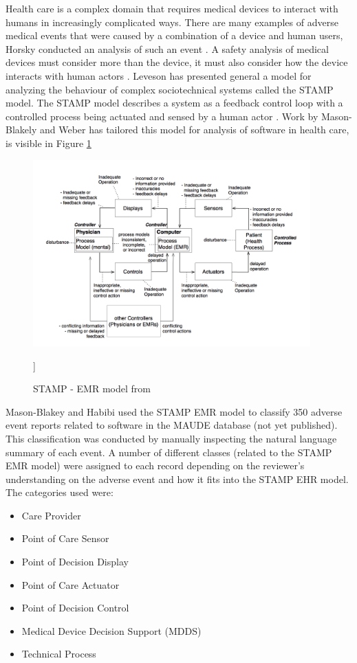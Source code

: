 \documentclass[11pt, notitlepage,abstracton,oneside]{article}   	%
\begin{document}
Health care is a complex domain that requires medical devices to interact with humans in increasingly complicated ways. There are many examples of adverse medical events that were caused by a combination of a device and human users, Horsky conducted an analysis of such an event \cite{horsky_2005}. A safety analysis of medical devices must consider more than the device, it must also consider how the device interacts with human actors \cite{karsh_health_2010}. Leveson has presented general a model for analyzing the behaviour of complex sociotechnical systems called the STAMP model. The STAMP model describes a system as a feedback control loop with a controlled process being actuated and sensed by a human actor \cite{leveson_engineering_2012}. Work by Mason-Blakely and Weber has tailored this model for analysis of software in health care, is visible in Figure \ref{fig:stamp-emr} \cite{stamp_emr_2011}

\begin{figure}[ht]
	\centering
	\includegraphics[width=0.95\textwidth]{figures/stamp-emr}
	\caption{STAMP - EMR model from \cite{stamp_emr_2011}}
	]\label{fig:stamp-emr}
\end{figure}

Mason-Blakey and Habibi used the STAMP EMR model to classify 350 adverse event reports related to software in the MAUDE database (not yet published). This classification was conducted by manually inspecting the natural language summary of each event. A number of different classes (related to the STAMP EMR model) were assigned to each record depending on the reviewer's understanding on the adverse event and how it fits into the STAMP EHR model. The categories used were: 

\begin{itemize}
	\item Care Provider
	\item Point of Care Sensor
	\item Point of Decision Display
	\item Point of Care Actuator
	\item Point of Decision Control
	\item Medical Device Decision Support (MDDS)
	\item Technical Process
\end{itemize}
\end{document}
